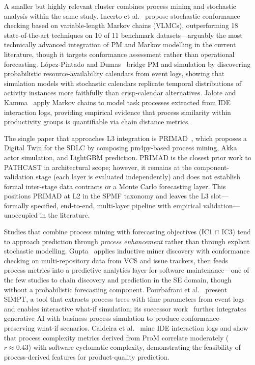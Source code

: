 A smaller but highly relevant cluster combines process mining and stochastic
analysis within the same study. Incerto et al.~\cite{incerto2025} propose
stochastic conformance checking based on variable-length Markov chains
(VLMCs), outperforming 18 state-of-the-art techniques on 10 of 11 benchmark
datasets---arguably the most technically advanced integration of PM and
Markov modelling in the current literature, though it targets conformance
assessment rather than operational forecasting. L\'opez-Pintado and
Dumas~\cite{lopezpintado2023} bridge PM and simulation by discovering
probabilistic resource-availability calendars from event logs, showing
that simulation models with stochastic calendars replicate temporal
distributions of activity instances more faithfully than crisp-calendar
alternatives. Jalote and Kamma~\cite{jalote2021} apply Markov chains to
model task processes extracted from IDE interaction logs, providing empirical
evidence that process similarity within productivity groups is quantifiable
via chain distance metrics.

The single paper that approaches L3 integration is PRIMAD~\cite{guinea2025},
which proposes a Digital Twin for the SDLC by composing pm4py-based process
mining, Akka actor simulation, and LightGBM prediction. PRIMAD is the closest
prior work to PATHCAST in architectural scope; however, it remains at the
component-validation stage (each layer is evaluated independently) and does
not establish formal inter-stage data contracts or a Monte Carlo forecasting
layer. This positions PRIMAD at L2 in the SPMF taxonomy and leaves the L3
slot---formally specified, end-to-end, multi-layer pipeline with empirical
validation---unoccupied in the literature.



Studies that combine process mining with forecasting objectives (IC1 $\cap$
IC3) tend to approach prediction through \emph{process enhancement} rather
than through explicit stochastic modelling. Gupta~\cite{gupta2017} applies
inductive miner discovery with conformance checking on multi-repository data
from VCS and issue trackers, then feeds process metrics into a predictive
analytics layer for software maintenance---one of the few studies to chain
discovery and prediction in the SE domain, though without a probabilistic
forecasting component. Pourbafrani et al.~\cite{pourbafrani2021} present
SIMPT, a tool that extracts process trees with time parameters from event
logs and enables interactive what-if simulation; its successor
work~\cite{buliga2025} further integrates generative AI with business process
simulation to produce conformance-preserving what-if scenarios. Caldeira et
al.~\cite{caldeira2022} mine IDE interaction logs and show that process
complexity metrics derived from ProM correlate moderately ($r \approx 0.43$)
with software cyclomatic complexity, demonstrating the feasibility of
process-derived features for product-quality prediction.

